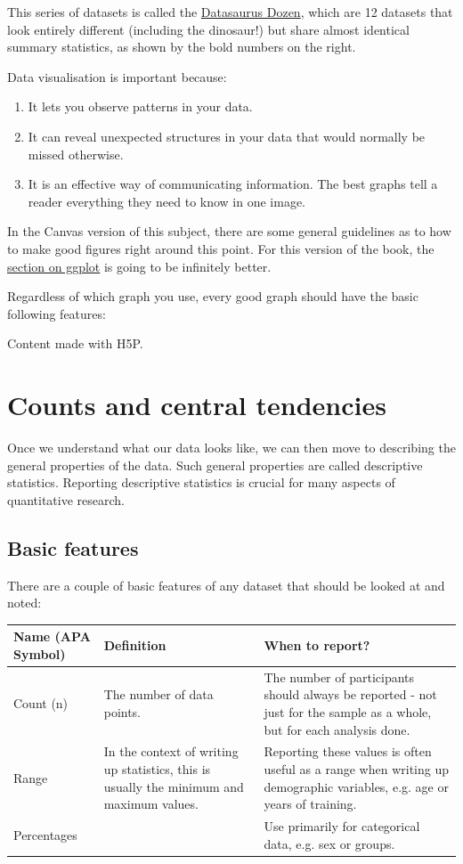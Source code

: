 \documentclass[
]{book}
\providecommand{\tightlist}{%
  \setlength{\itemsep}{0pt}\setlength{\parskip}{0pt}}
\begin{document}
This series of datasets is called the \href{https://www.research.autodesk.com/publications/same-stats-different-graphs/}{Datasaurus Dozen}, which are 12 datasets that look entirely different (including the dinosaur!) but share almost identical summary statistics, as shown by the bold numbers on the right.

Data visualisation is important because:

\begin{enumerate}
\def\labelenumi{\arabic{enumi}.}
\tightlist
\item
  It lets you observe patterns in your data.
\item
  It can reveal unexpected structures in your data that would normally be missed otherwise.
\item
  It is an effective way of communicating information. The best graphs tell a reader everything they need to know in one image.
\end{enumerate}

In the Canvas version of this subject, there are some general guidelines as to how to make good figures right around this point. For this version of the book, the \hyperref[ggplot]{section on ggplot} is going to be infinitely better.

Regardless of which graph you use, every good graph should have the basic following features:

Content made with H5P.

\section{Counts and central tendencies}\label{basic-desc}

Once we understand what our data looks like, we can then move to describing the general properties of the data. Such general properties are called descriptive statistics. Reporting descriptive statistics is crucial for many aspects of quantitative research.

\subsection{Basic features}\label{count-basics}

There are a couple of basic features of any dataset that should be looked at and noted:

\begin{tabular}{l|l|l}
\hline
Name (APA Symbol) & Definition & When to report?\\
\hline
Count (n) & The number of data points. & The number of participants should always be reported - not just for the sample as a whole, but for each analysis done.\\
\hline
Range & In the context of writing up statistics, this is usually the minimum and maximum values. & Reporting these values is often useful as a range when writing up demographic variables, e.g. age or years of training.\\
\hline
Percentages &  & Use primarily for categorical data, e.g. sex or groups.\\
\hline
\end{tabular}
\end{document}
